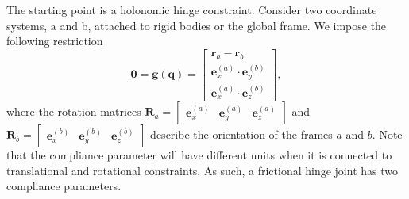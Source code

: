 \documentclass[preprint,12pt]{elsarticle}
\let\vec\bm
\let\mat\mathbf
\numberwithin{equation}{section}
\begin{document}
The starting point is a holonomic hinge constraint.
Consider two coordinate systems, $\text{a}$ and $\text{b}$, attached to rigid bodies or the global frame. We impose the following restriction
\begin{equation}
    \label{eq:holonomic_hinge}
    \vec{0} = \vec{g}(\vec{q}) =
    \begin{bmatrix}
        \vec{r}_a - \vec{r}_b     \\
        \vec{e}_x^{(a)} \cdot \vec{e}_y^{(b)} \\
        \vec{e}_x^{(a)} \cdot \vec{e}_z^{(b)}
    \end{bmatrix},
\end{equation}
where the rotation matrices $\mat{R}_a = \begin{bmatrix}\vec{e}_x^{(a)} & \vec{e}_y^{(a)} & \vec{e}_z^{(a)}\end{bmatrix}$ and $\mat{R}_b = \begin{bmatrix}\vec{e}_x^{(b)} & \vec{e}_y^{(b)} & \vec{e}_z^{(b)}\end{bmatrix}$ describe the orientation of the frames $a$ and $b$.
Note that the compliance parameter will have different units when it is connected to translational and rotational constraints.
As such, a frictional hinge joint has two compliance parameters.
\end{document}
